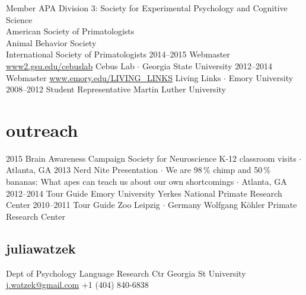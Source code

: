 \documentclass[]{friggeri-cv}
\begin{document}
\begin{entrylist}
  \entry
    {}
    {Member}
    {}
    {
    APA Division 3: Society for Experimental Psychology and Cognitive Science\\
    American Society of Primatologists\\
    Animal Behavior Society\\
    International Society of Primatologists
    }
  \entry
    {2014--2015}
    {Webmaster}
    {\href{http://www2.gsu.edu/cebuslab}{www2.gsu.edu/cebuslab}}
    {Cebus Lab $\cdot$ Georgia State University}
  \entry
    {2012--2014}
    {Webmaster}
    {\href{http://www.emory.edu/LIVING_LINKS}{www.emory.edu/LIVING\_LINKS}}
    {Living Links $\cdot$ Emory University}
  \entry
    {2008--2012}
    {Student Representative}
    {}
    {Martin Luther University}
\end{entrylist}

\section{outreach}

\begin{entrylist}
  \entry
    {2015}
    {Brain Awareness Campaign}
    {Society for Neuroscience}
    {K-12 classroom visits $\cdot$ Atlanta, GA}
  \entry
    {2013}
    {Nerd Nite}
    {}
    {Presentation $\cdot$ We are 98\,\% chimp and 50\,\% bananas: What apes can teach us about our own shortcomings $\cdot$ Atlanta, GA}
  \entry
    {2012--2014}
    {Tour Guide}
    {Emory University}
    {Yerkes National Primate Research Center}
  \entry
    {2010--2011}
    {Tour Guide}
    {Zoo Leipzig $\cdot$ Germany}
    {Wolfgang K\"{o}hler Primate Research Center}
\end{entrylist}

\begin{aside}
  \section{{\normalfont julia}watzek}
    Dept of Psychology
    Language Research Ctr
    Georgia St University
    ~
    \href{mailto:j.watzek@gmail.com}{j.watzek@gmail.com}
    +1 (404) 840-6838
\end{aside}
\end{document}
